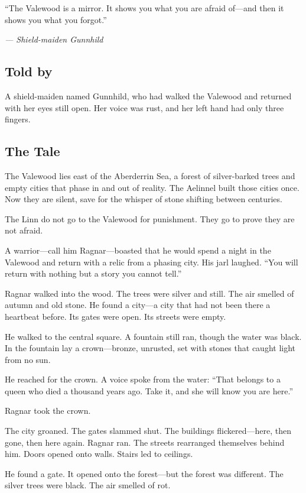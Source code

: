 \documentclass[9pt,a5paper]{extbook}
\begin{document}
\epigraph{``The Valewood is a mirror. It shows you what you are afraid of---and then it shows you what you forgot.''}{\textit{--- Shield-maiden Gunnhild}}

\subsection*{Told by}

A shield-maiden named Gunnhild, who had walked the Valewood and returned with her eyes still open. Her voice was rust, and her left hand had only three fingers.

\subsection*{The Tale}

The Valewood lies east of the Aberderrin Sea, a forest of silver-barked trees and empty cities that phase in and out of reality. The Aelinnel built those cities once. Now they are silent, save for the whisper of stone shifting between centuries.

The Linn do not go to the Valewood for punishment. They go to prove they are not afraid.

A warrior---call him Ragnar---boasted that he would spend a night in the Valewood and return with a relic from a phasing city. His jarl laughed. ``You will return with nothing but a story you cannot tell.''

Ragnar walked into the wood. The trees were silver and still. The air smelled of autumn and old stone. He found a city---a city that had not been there a heartbeat before. Its gates were open. Its streets were empty.

He walked to the central square. A fountain still ran, though the water was black. In the fountain lay a crown---bronze, unrusted, set with stones that caught light from no sun.

He reached for the crown. A voice spoke from the water: ``That belongs to a queen who died a thousand years ago. Take it, and she will know you are here.''

Ragnar took the crown.

The city groaned. The gates slammed shut. The buildings flickered---here, then gone, then here again. Ragnar ran. The streets rearranged themselves behind him. Doors opened onto walls. Stairs led to ceilings.

He found a gate. It opened onto the forest---but the forest was different. The silver trees were black. The air smelled of rot.
\end{document}

